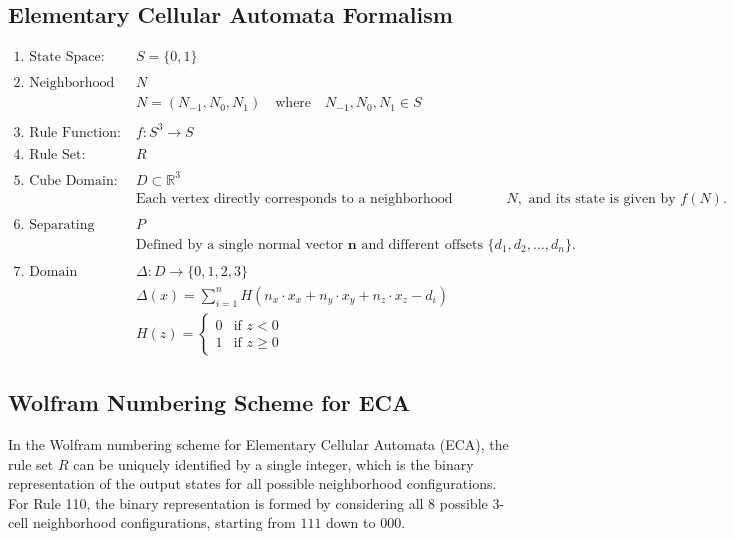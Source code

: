 \subsection{Elementary Cellular Automata Formalism}
\[
\begin{array}{lll}
\text{1. State Space:} & S = \{0, 1\} \\
\\
\text{2. Neighborhood Configuration:} & N \\
& N = (N_{-1}, N_0, N_1) \quad \text{where} \quad N_{-1}, N_0, N_1 \in S \\
\\
\text{3. Rule Function:} & f: S^3 \to S \\
\\
\text{4. Rule Set:} & R \\
\\
\text{5. Cube Domain:} & D \subset \mathbb{R}^3 \\
& \text{Each vertex directly corresponds to a neighborhood configuration } N, \text{ and its state is given by } f(N). \\
\\
\text{6. Separating Planes:} & P \\
& \text{Defined by a single normal vector } \mathbf{n} \text{ and different offsets } \{d_1, d_2, \ldots, d_n\}. \\
\\
\text{7. Domain Classification Function:} & \Delta: D \to \{0, 1, 2, 3\} \\
& \Delta(x) = \sum_{i=1}^{n} H(n_x \cdot x_x + n_y \cdot x_y + n_z \cdot x_z - d_i) \\
& H(z) = 
\begin{cases} 
0 & \text{if } z < 0 \\
1 & \text{if } z \geq 0 
\end{cases}
\end{array}
\]

\subsection{Wolfram Numbering Scheme for ECA}
\label{sec:Wolfram Numbering Scheme for ECA}
In the Wolfram numbering scheme for Elementary Cellular Automata (ECA), the rule set \( R \) can be uniquely identified by a single integer, which is the binary representation of the output states for all possible neighborhood configurations. For Rule 110, the binary representation is formed by considering all 8 possible 3-cell neighborhood configurations, starting from \( 111 \) down to \( 000 \).

